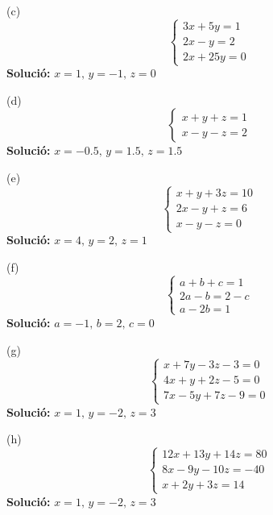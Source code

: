 \documentclass[12pt]{article}
\begin{document}
\begin{exercici}
(c)
\[
\begin{cases}
3x + 5y = 1 \\
2x - y = 2 \\
2x + 25y = 0
\end{cases}
\]
\textbf{Solució:} \( x = 1, \, y = -1, \, z = 0 \)
\end{exercici}

\begin{exercici}
(d)
\[
\begin{cases}
x + y + z = 1 \\
x - y - z = 2
\end{cases}
\]
\textbf{Solució:} \( x = -0.5, \, y = 1.5, \, z = 1.5 \)
\end{exercici}

\begin{exercici}
(e)
\[
\begin{cases}
x + y + 3z = 10 \\
2x - y + z = 6 \\
x - y - z = 0
\end{cases}
\]
\textbf{Solució:} \( x = 4, \, y = 2, \, z = 1 \)
\end{exercici}

\begin{exercici}
(f)
\[
\begin{cases}
a + b + c = 1 \\
2a - b = 2 - c \\
a - 2b = 1
\end{cases}
\]
\textbf{Solució:} \( a = -1, \, b = 2, \, c = 0 \)
\end{exercici}

\begin{exercici}
(g)
\[
\begin{cases}
x + 7y - 3z - 3 = 0 \\
4x + y + 2z - 5 = 0 \\
7x - 5y + 7z - 9 = 0
\end{cases}
\]
\textbf{Solució:} \( x = 1, \, y = -2, \, z = 3 \)
\end{exercici}

\begin{exercici}
(h)
\[
\begin{cases}
12x + 13y + 14z = 80 \\
8x - 9y - 10z = -40 \\
x + 2y + 3z = 14
\end{cases}
\]
\textbf{Solució:} \( x = 1, \, y = -2, \, z = 3 \)
\end{exercici}
\end{document}
